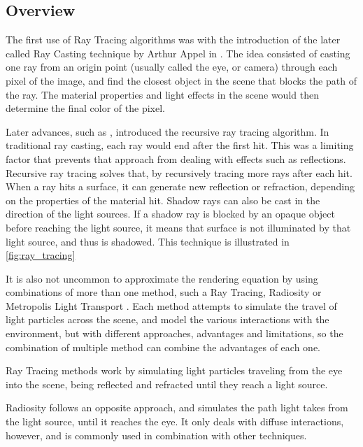 \documentclass[main.tex]{subfiles}
\begin{document}
\subsection{Overview}

The first use of Ray Tracing algorithms was with the introduction of the later called Ray Casting technique by Arthur Appel in \cite{appel1968some}. The idea consisted of casting one ray from an origin point (usually called the eye, or camera) through each pixel of the image, and find the closest object in the scene that blocks the path of the ray. The material properties and light effects in the scene would then determine the final color of the pixel.

Later advances, such as \cite{whitted2005improved}, introduced the recursive ray tracing algorithm. In traditional ray casting, each ray would end after the first hit. This was a limiting factor that prevents that approach from dealing with effects such as reflections. Recursive ray tracing solves that, by recursively tracing more rays after each hit. When a ray hits a surface, it can generate new reflection or refraction, depending on the properties of the material hit. Shadow rays can also be cast in the direction of the light sources. If a shadow ray is blocked by an opaque object before reaching the light source, it means that surface is not illuminated by that light source, and thus is shadowed. This technique is illustrated in \cref{fig:ray_tracing}




It is also not uncommon to approximate the rendering equation by using combinations of more than one method, such a Ray Tracing, Radiosity or Metropolis Light Transport \cite{wallace1987two,veach1997metropolis}. Each method attempts to simulate the travel of light particles across the scene, and model the various interactions with the environment, but with different approaches, advantages and limitations, so the combination of multiple method can combine the advantages of each one.

Ray Tracing methods work by simulating light particles traveling from the eye into the scene, being reflected and refracted until they reach a light source.

Radiosity follows an opposite approach, and simulates the path light takes from the light source, until it reaches the eye. It only deals with diffuse interactions, however, and is commonly used in combination with other techniques.
\end{document}
